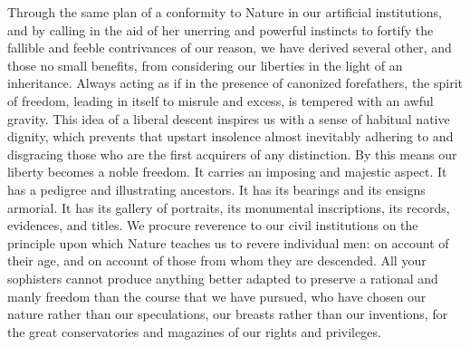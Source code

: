 Through the same plan of a conformity to Nature in our artificial institutions, and by calling in the aid of her unerring and powerful instincts to fortify the fallible and feeble contrivances of our reason, we have derived several other, and those no small benefits, from considering our liberties in the light of an inheritance. Always acting as if in the presence of canonized forefathers, the spirit of freedom, leading in itself to misrule and excess, is tempered with an awful gravity. This idea of a liberal descent inspires us with a sense of habitual native dignity, which prevents that upstart insolence almost inevitably adhering to and disgracing those who are the first acquirers of any distinction. By this means our liberty becomes a noble freedom. It carries an imposing and majestic aspect. It has a pedigree and illustrating ancestors. It has its bearings and its ensigns armorial. It has its gallery of portraits, its monumental inscriptions, its records, evidences, and titles. We procure reverence to our civil institutions on the principle upon which Nature teaches us to revere individual men: on account of their age, and on account of those from whom they are descended. All your sophisters cannot produce anything better adapted to preserve a rational and manly freedom than the course that we have pursued, who have chosen our nature rather than our speculations, our breasts rather than our inventions, for the great conservatories and magazines of our rights and privileges.

